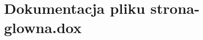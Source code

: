 \hypertarget{strona-glowna_8dox}{\section{Dokumentacja pliku strona-\/glowna.dox}
\label{strona-glowna_8dox}
}
